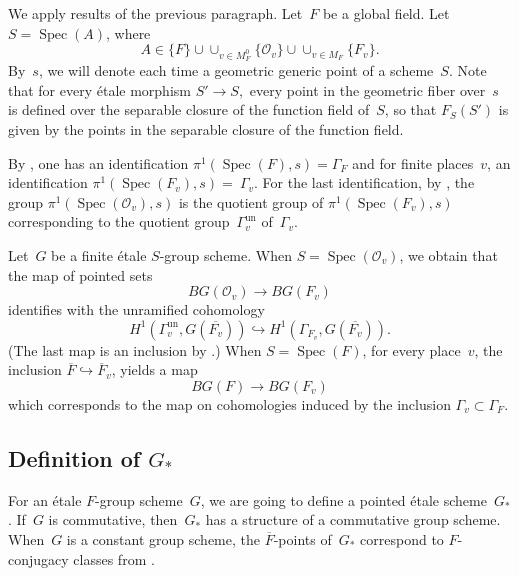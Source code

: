 \documentclass[a4paper,english,12pt]{amsart}
\newcommand{\Fv}{F_v}
\newcommand{\Ov}{\mathcal O _v}
\newcommand{\vMF}{v\in M_F}
\newcommand{\vMFz}{v\in M_F ^0}
\DeclareMathOperator{\Spec}{Spec}
\DeclareMathOperator{\un}{un}
\numberwithin{equation}{subsection}
\begin{document}
\subsubsection{} We apply results of the previous paragraph. Let~$F$ be a global field. Let $S=\Spec(A)$, where $$A\in\{F\}\cup\cup_{\vMFz}\{\Ov\}\cup\cup_{\vMF}\{F_v\}.$$ %
By~$s$, we will denote each time a geometric generic point of a scheme~$S$. Note that for every \' etale morphism $S'\to S,$ every point in the geometric fiber over~$s$ is defined over the separable closure of the function field of~$S$, so that $F_{S}(S')$ is given by the points in the separable closure of the function field.

By \cite[\' Expos\' e V, Proposition 8.1]{SGAj}, one has an identification $\pi^1(\Spec(F), s)=\Gamma_F$ and for finite places~$v$, an identification $\pi^1(\Spec(F_v), s)=~\Gamma_v$. For the last identification, by \cite[\' Expos\' e V, Proposition 8.2]{SGAj}, the group $\pi^1(\Spec(\Ov), s)$ is the quotient group of $\pi^1(\Spec(\Fv), s)$ corresponding to the quotient group~$\Gamma_v^{\un}$ of~$\Gamma_v$. 

Let~$G$ be a finite \' etale $S$-group scheme. %
When $S=\Spec(\Ov)$, we obtain that the map of pointed sets %
$$BG(\Ov)\to BG(F_v)$$ identifies with the unramified cohomology $$H^1(\Gamma_v^{\un}, G(\overline {F_v}))\hookrightarrow H^1(\Gamma_{F_v}, G(\overline {F_v})).$$ (The last map is an inclusion by \cite[Chapter I, \S 5.8 (a) and Chapter I \S 2.6 (b)]{Cohomologiegalois}.) When $S=\Spec(F)$, for every place~$v$, the inclusion $\overline F\hookrightarrow\overline F_v$, yields a map $$BG(F)\to BG(F_v)$$ which corresponds to the map on cohomologies induced by the inclusion $\Gamma_v\subset\Gamma_F$. 
\subsection{Definition of $G_*$}For an \' etale $F$-group scheme~$G$, we are going to define a pointed \' etale scheme~$G_*$. If~$G$ is commutative, then~$G_*$ has a structure of a commutative group scheme. When~$G$ is a constant group scheme, the $\overline F$-points of~$G_*$ correspond to $F$-conjugacy classes from \cite{Malle}. 
\end{document}
